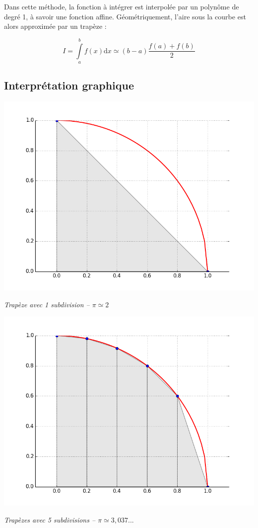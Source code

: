 \documentclass[10pt,fleqn]{article} %
\begin{document}
\begin{defi}
Dans cette méthode, la fonction à intégrer est interpolée par un polynôme de degré 1, à savoir une fonction affine. Géométriquement, l'aire sous la courbe est alors approximée par un trapèze :

$$
I = \int\limits_a^{b} f(x) \mathrm{d}x \simeq \left(b-a\right) \dfrac{f(a)+f(b)}{2} 
$$

\end{defi}

\subsection{Interprétation graphique}
\begin{minipage}[c]{.3\linewidth}
\begin{center}
\includegraphics[width=.99\textwidth]{images/CourbesPython/pi_trap_1}

\textit{Trapèze avec 1 subdivision -- $\pi \simeq 2$}
\end{center}
\end{minipage}\hfill
\begin{minipage}[c]{.3\linewidth}
\begin{center}
\includegraphics[width=.99\textwidth]{images/CourbesPython/pi_trap}

\textit{Trapèzes avec 5 subdivisions -- $\pi \simeq 3,037...$  }
\end{center}
\end{minipage} \hfill
\end{document}
